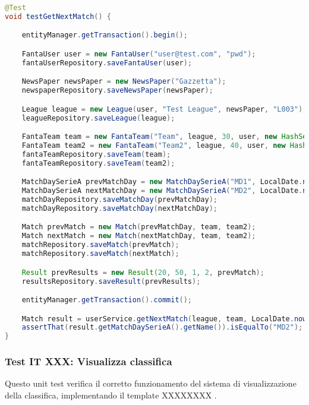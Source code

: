 \begin{lstlisting}[language=Java]
@Test
void testGetNextMatch() {

	entityManager.getTransaction().begin();

	FantaUser user = new FantaUser("user@test.com", "pwd");
	fantaUserRepository.saveFantaUser(user);

	NewsPaper newsPaper = new NewsPaper("Gazzetta");
	newspaperRepository.saveNewsPaper(newsPaper);

	League league = new League(user, "Test League", newsPaper, "L003");
	leagueRepository.saveLeague(league);

	FantaTeam team = new FantaTeam("Team", league, 30, user, new HashSet<>());
	FantaTeam team2 = new FantaTeam("Team2", league, 40, user, new HashSet<>());
	fantaTeamRepository.saveTeam(team);
	fantaTeamRepository.saveTeam(team2);

	MatchDaySerieA prevMatchDay = new MatchDaySerieA("MD1", LocalDate.now().minusWeeks(1));
	MatchDaySerieA nextMatchDay = new MatchDaySerieA("MD2", LocalDate.now().plusWeeks(1));
	matchDayRepository.saveMatchDay(prevMatchDay);
	matchDayRepository.saveMatchDay(nextMatchDay);

	Match prevMatch = new Match(prevMatchDay, team, team2);
	Match nextMatch = new Match(nextMatchDay, team, team2);
	matchRepository.saveMatch(prevMatch);
	matchRepository.saveMatch(nextMatch);

	Result prevResults = new Result(20, 50, 1, 2, prevMatch);
	resultsRepository.saveResult(prevResults);

	entityManager.getTransaction().commit();

	Match result = userService.getNextMatch(league, team, LocalDate.now());
	assertThat(result.getMatchDaySerieA().getName()).isEqualTo("MD2");
}
\end{lstlisting}


\subsubsection{Test IT XXX: Visualizza classifica}

Questo unit test verifica il corretto funzionamento del sistema di visualizzazione della classifica,
implementando il template XXXXXXXX .

